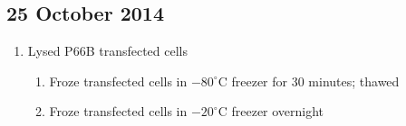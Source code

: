 \subsection*{25 October 2014}

\begin{enumerate}
	\item Lysed P66B transfected cells
		\begin{enumerate}
			\item Froze transfected cells in $-80^{\circ}$C freezer for 30 minutes; thawed
			\item Froze transfected cells in $-20^{\circ}$C freezer overnight
		\end{enumerate}
\end{enumerate}

